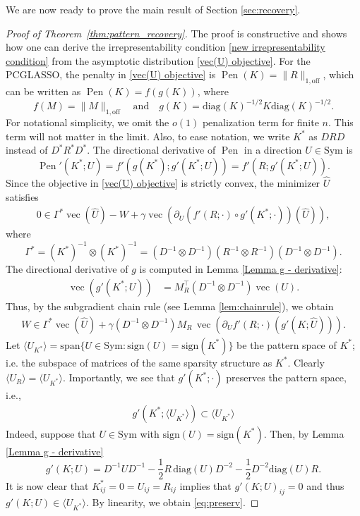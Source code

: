 \documentclass[12pt]{amsart}
\numberwithin{equation}{section}
\numberwithin{equation}{section}
\theoremstyle{plain}
\theoremstyle{definition}
\newcommand{\diag}[1]{\mathrm{diag}(#1)}
\newcommand{\Sym}{\mathrm{Sym}}
\newcommand{\sign}{\mathrm{sign}}
\begin{document}
We are now ready to prove the main result of Section \ref{sec:recovery}. 
\begin{proof}[Proof of Theorem~\ref{thm:pattern_recovery}]
The proof is constructive and shows how one can derive the irrepresentability condition \eqref{new irrepresentability condition} from the asymptotic distribution \eqref{vec(U) objective}.
For the PCGLASSO, the penalty in \eqref{vec(U) objective} is $\operatorname{Pen}(K)=\| R\|_{1,\mathrm{off}}$, 
  which can be written as $\operatorname{Pen}(K)= f(g(K))$, where 
   \[
   f(M)=\|M\|_{1,\mathrm{off}}\quad\mbox{and}\quad g(K)=\diag{K}^{-1/2}K \diag{K}^{-1/2}.  
   \]
For notational simplicity, we omit the $o(1)$ penalization term for finite $n$. This term will not matter in the limit. Also, to ease notation, we write $K^\ast$ as $DRD$ instead of $D^\ast R^\ast D^\ast$. 
   The directional derivative of $\operatorname{Pen}$ in a direction $U\in\Sym$ is 
   \begin{equation*}
      \operatorname{Pen}'(K^\ast; U) = f'(g(K^\ast);g'(K^\ast;U))=f'(R ;g'(K^\ast;U)).
   \end{equation*}
Since the objective in  \eqref{vec(U) objective}  is strictly convex, the minimizer $\hat{U}$ satisfies 
\begin{align*}
    0 \in \Gamma^\ast\operatorname{vec}(\hat{U})-W + \gamma \operatorname{vec}\left( \partial_{U}\left( f'(R;\cdot) \circ g'(K^\ast;\cdot)\right)(\hat{U})\right),
\end{align*}
where 
\[
\Gamma^\ast = (K^\ast)^{-1}\otimes (K^\ast)^{-1} = (D^{-1}\otimes D^{-1}) (R^{-1}\otimes R^{-1})(D^{-1}\otimes D^{-1}).
\]
The directional derivative of $g$ is computed in Lemma \ref{Lemma g - derivative}:
\begin{align*}
    \operatorname{vec}(g'(K^\ast;U)) &= M_R^\top (D^{-1}\otimes D^{-1})\operatorname{vec}(U).%
\end{align*}
Thus, by the subgradient chain rule (see Lemma \ref{lem:chainrule}), we obtain
\begin{align*}
    W \in \Gamma^\ast\operatorname{vec}(\hat{U}) +  \gamma  (D^{-1}\otimes D^{-1})M_{R} \, \operatorname{vec}\left(\partial_U f'(R;\cdot)(g'(K;\hat{U})) \right).
\end{align*}
Let $\langle U_{K^\ast}\rangle=\mathrm{span}\{U\in \Sym\colon \sign(U)=\sign(K^\ast)\}$ be the pattern space of $K^\ast$; i.e. the subspace of matrices of the same sparsity structure as $K^\ast$. Clearly $\langle U_R\rangle=\langle U_{K^\ast}\rangle$. Importantly, we see that $g'(K^\ast;\cdot)$ preserves  the pattern space, i.e., 
\begin{align}\label{eq:preserv}
g'(K^\ast;\langle U_{K^\ast}\rangle)\subset \langle U_{K^\ast}\rangle    
\end{align}
Indeed, suppose that  $U\in\Sym$ with $\sign(U)=\sign(K^\ast)$. Then, by Lemma \ref{Lemma g - derivative} 
\[
 g'(K;U) =  D^{-1} U D^{-1}-\frac{1}{2} R\, \diag{U} D^{-2}-\frac{1}{2} D^{-2}\diag{U} R.
\]
It is now clear that $K_{ij}^\ast=0=U_{ij}=R_{ij}$ implies that $g'(K;U)_{ij}=0$ and thus $g'(K;U)\in \langle U_{K^\ast}\rangle$. By linearity, we obtain \eqref{eq:preserv}. 


\end{proof}
\end{document}
